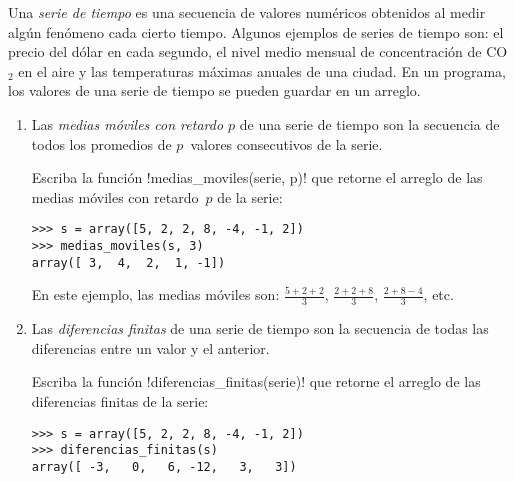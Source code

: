 Una \emph{serie de tiempo}
es una secuencia de valores numéricos
obtenidos al medir algún fenómeno cada cierto tiempo.
Algunos ejemplos de series de tiempo son:
el precio del dólar en cada segundo,
el nivel medio mensual de concentración de CO\(_2\) en el aire y
las temperaturas máximas anuales de una ciudad.
En un programa, los valores de una serie de tiempo se pueden guardar en un arreglo.

\begin{enumerate}
  \item Las \emph{medias móviles con retardo \(p\)} de una serie de tiempo
    son la secuencia de todos los promedios de \(p\)~valores consecutivos de la serie.


    Escriba la función \li!medias_moviles(serie, p)!
    que retorne el arreglo de las medias móviles con retardo~\(p\) de la serie:
    \begin{lstlisting}
>>> s = array([5, 2, 2, 8, -4, -1, 2])
>>> medias_moviles(s, 3)
array([ 3,  4,  2,  1, -1])
    \end{lstlisting}

    En este ejemplo,
    las medias móviles son:
    \(\frac{5 + 2 + 2}{3}\),
    \(\frac{2 + 2 + 8}{3}\),
    \(\frac{2 + 8 - 4}{3}\),
    etc.

  \item Las \emph{diferencias finitas} de una serie de tiempo
    son la secuencia de todas las diferencias entre un valor y el anterior.


    Escriba la función \li!diferencias_finitas(serie)!
    que retorne el arreglo de las diferencias finitas de la serie:
    \begin{lstlisting}
>>> s = array([5, 2, 2, 8, -4, -1, 2])
>>> diferencias_finitas(s)
array([ -3,   0,   6, -12,   3,   3])
    \end{lstlisting}

\end{enumerate}

